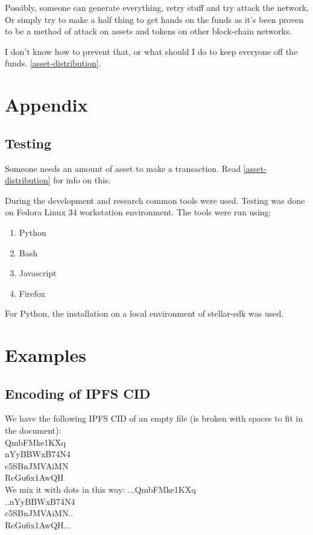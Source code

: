 \documentclass[10pt,a4paper,twocolumn]{paper}
\begin{document}
	Possibly, someone can generate everything, retry stuff and try attack the network. Or simply try to make a half thing to get hands on the funds as it's been proven to be a method of attack on assets and tokens on other block-chain networks.

	I don't know how to prevent that, or what should I do to keep everyone off the funds. \ref{asset-distribution}.
\section{Appendix}\label{appendix}
\subsection{Testing}\label{testing}

Someone needs an amount of asset to make a transaction. Read
\ref{asset-distribution} for info on this.

During the development and research common tools were used. Testing was done on Fedora Linux 34 workstation environment. The tools were run using:
\begin{enumerate}
	\item Python
	\item Bash
	\item Javascript
	\item Firefox
\end{enumerate}

For Python, the installation on a local environment of stellar-sdk was used.

\section{Examples}\label{examples}

\subsection{Encoding of IPFS CID}\label{example-encoding}

We have the following IPFS CID of an empty file (is broken with spaces to fit in the document):\\
QmbFMke1KXq\\
nYyBBWxB74N4\\
c5SBnJMVAiMN\\
RcGu6x1AwQH\\

We mix it with dots in this way:
...QmbFMke1KXq\\
..nYyBBWxB74N4\\
c5SBnJMVAiMN..\\
RcGu6x1AwQH...\\
\end{document}
